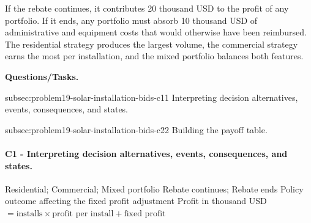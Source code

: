 	If the rebate continues, it contributes 20 thousand USD to the profit of any portfolio. If it ends, any portfolio must absorb 10 thousand USD of administrative and equipment costs that would otherwise have been reimbursed. The residential strategy produces the largest volume, the commercial strategy earns the most per installation, and the mixed portfolio balances both features.

	\textbf{Questions/Tasks.}
	\begin{enumerate}
		\CriterionTask
		{subsec:problem19-solar-installation-bids-c1}{1}
		{Interpreting decision alternatives, events, consequences, and states.}

		\CriterionTask
		{subsec:problem19-solar-installation-bids-c2}{2}
		{Building the payoff table.}
	\end{enumerate}

\paragraph*{C1 - Interpreting decision alternatives, events, consequences, and states.}
	\label{subsec:problem19-solar-installation-bids-c1}
	\DecisionElementsTable
	{Residential; Commercial; Mixed portfolio}
	{Rebate continues; Rebate ends}
	{Policy outcome affecting the fixed profit adjustment}
	{Profit in thousand USD $= \text{installs} \times \text{profit per install} + \text{fixed profit}$}


